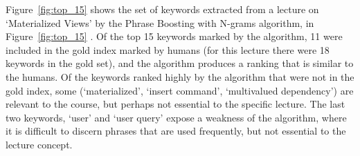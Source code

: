 

Figure~\ref{fig:top_15} shows the set of keywords extracted from a
lecture on `Materialized Views' by the Phrase Boosting with N-grams
algorithm, in Figure~\ref{fig:top_15} . Of the top 15 keywords marked
by the algorithm, 11 were included in the gold index marked by humans
(for this lecture there were 18 keywords in the gold set), and the
algorithm produces a ranking that is similar to the humans. Of the
keywords ranked highly by the algorithm that were not in the gold
index, some (`materialized', `insert command', `multivalued
dependency') are relevant to the course, but perhaps not essential to
the specific lecture. The last two keywords, `user' and `user query'
expose a weakness of the algorithm, where it is difficult to discern
phrases that are used frequently, but not essential to the lecture
concept.
